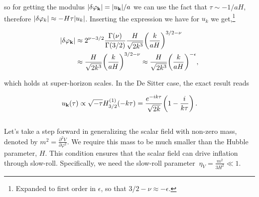 so for getting the modulus \(\abs{ \delta \varphi _{\mathbf{k}}} = \abs{ u_{\mathbf{k}}} / a\) we can  use the fact that \(\tau \sim - 1/aH\), therefore \(\abs{ \delta \varphi _k} \approx - H \tau \abs{u_k}\). 
Inserting the expression we have for \(u_k\) we get,\footnote{Expanded to first order in \(\epsilon \), so that \(3/2 - \nu \approx - \epsilon \).}

\begin{align}
    \abs{ \delta \varphi _{\mathbf{k}}} 
    &\approx 2^{\nu - 3/2} \frac{\Gamma (\nu )}{\Gamma (3/2)} \frac{H}{\sqrt{2 k^3}} \qty(\frac{k}{aH})^{3/2 - \nu } \label{1.2.101} \\
    &\approx \frac{H}{\sqrt{2 k^3}} \qty( \frac{k}{aH})^{3/2 - \nu }
    \approx \frac{H}{\sqrt{2 k^3}} \qty( \frac{k}{aH})^{-\epsilon },\label{1.2.102}
\end{align}

which holds at super-horizon scales. In the De Sitter case, the exact result reads

\begin{align}
 u_{\mathbf{k}}(\tau ) \propto \sqrt{- \tau } H^{(1)}_{3/2} (- k \tau )
= \frac{e^{-ik \tau }}{\sqrt{2k}} \qty(1 - \frac{i}{k \tau })
\,.\label{1.2.103}
\end{align}\\



\hspace{0.5cm}Let's take a step forward in generalizing the scalar field with non-zero mass, denoted by $m^2 = \frac{\partial^2 V}{\partial \varphi^2}$. We require this mass to be much smaller than the Hubble parameter, $H$. This condition ensures that the scalar field can drive inflation through slow-roll. Specifically, we need the slow-roll parameter $\ \eta_V = \frac{m^2}{3H^2} \ll 1$.

